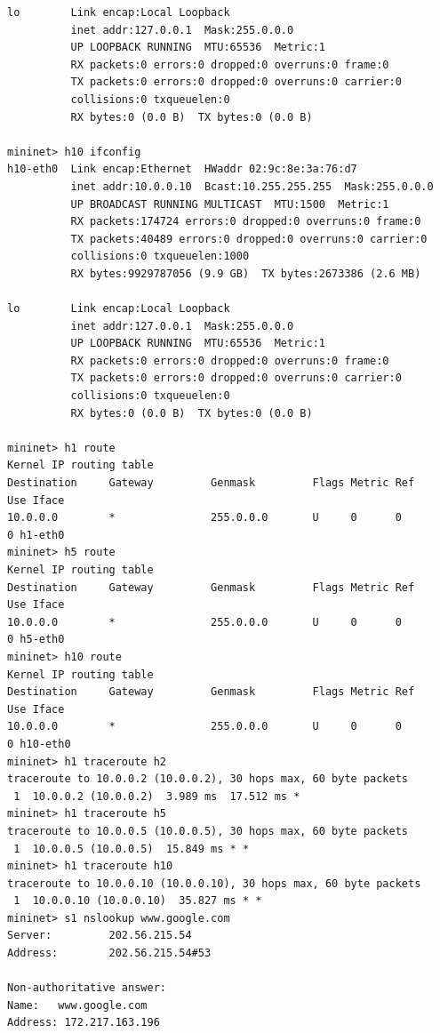 \documentclass[a4paper, 11pt]{article}
\begin{document}
\begin{appendices}
\begin{lstlisting}[style=BashInputStyle]
lo        Link encap:Local Loopback
          inet addr:127.0.0.1  Mask:255.0.0.0
          UP LOOPBACK RUNNING  MTU:65536  Metric:1
          RX packets:0 errors:0 dropped:0 overruns:0 frame:0
          TX packets:0 errors:0 dropped:0 overruns:0 carrier:0
          collisions:0 txqueuelen:0
          RX bytes:0 (0.0 B)  TX bytes:0 (0.0 B)

mininet> h10 ifconfig
h10-eth0  Link encap:Ethernet  HWaddr 02:9c:8e:3a:76:d7
          inet addr:10.0.0.10  Bcast:10.255.255.255  Mask:255.0.0.0
          UP BROADCAST RUNNING MULTICAST  MTU:1500  Metric:1
          RX packets:174724 errors:0 dropped:0 overruns:0 frame:0
          TX packets:40489 errors:0 dropped:0 overruns:0 carrier:0
          collisions:0 txqueuelen:1000
          RX bytes:9929787056 (9.9 GB)  TX bytes:2673386 (2.6 MB)

lo        Link encap:Local Loopback
          inet addr:127.0.0.1  Mask:255.0.0.0
          UP LOOPBACK RUNNING  MTU:65536  Metric:1
          RX packets:0 errors:0 dropped:0 overruns:0 frame:0
          TX packets:0 errors:0 dropped:0 overruns:0 carrier:0
          collisions:0 txqueuelen:0
          RX bytes:0 (0.0 B)  TX bytes:0 (0.0 B)

mininet> h1 route
Kernel IP routing table
Destination     Gateway         Genmask         Flags Metric Ref    Use Iface
10.0.0.0        *               255.0.0.0       U     0      0        0 h1-eth0
mininet> h5 route
Kernel IP routing table
Destination     Gateway         Genmask         Flags Metric Ref    Use Iface
10.0.0.0        *               255.0.0.0       U     0      0        0 h5-eth0
mininet> h10 route
Kernel IP routing table
Destination     Gateway         Genmask         Flags Metric Ref    Use Iface
10.0.0.0        *               255.0.0.0       U     0      0        0 h10-eth0
mininet> h1 traceroute h2
traceroute to 10.0.0.2 (10.0.0.2), 30 hops max, 60 byte packets
 1  10.0.0.2 (10.0.0.2)  3.989 ms  17.512 ms *
mininet> h1 traceroute h5
traceroute to 10.0.0.5 (10.0.0.5), 30 hops max, 60 byte packets
 1  10.0.0.5 (10.0.0.5)  15.849 ms * *
mininet> h1 traceroute h10
traceroute to 10.0.0.10 (10.0.0.10), 30 hops max, 60 byte packets
 1  10.0.0.10 (10.0.0.10)  35.827 ms * *
mininet> s1 nslookup www.google.com
Server:         202.56.215.54
Address:        202.56.215.54#53

Non-authoritative answer:
Name:   www.google.com
Address: 172.217.163.196
\end{lstlisting}


\end{appendices}
\end{document}

